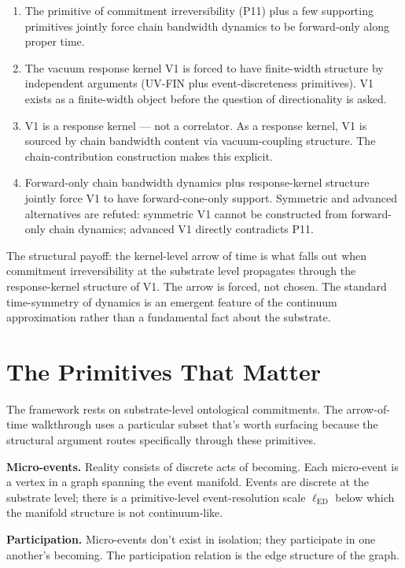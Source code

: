 \documentclass[11pt,a4paper]{article}
\begin{document}
\begin{enumerate}[noitemsep]
  \item The primitive of commitment irreversibility (P11) plus a few supporting primitives jointly force chain bandwidth dynamics to be forward-only along proper time.
  \item The vacuum response kernel V1 is forced to have finite-width structure by independent arguments (UV-FIN plus event-discreteness primitives). V1 exists as a finite-width object before the question of directionality is asked.
  \item V1 is a response kernel --- not a correlator. As a response kernel, V1 is sourced by chain bandwidth content via vacuum-coupling structure. The chain-contribution construction makes this explicit.
  \item Forward-only chain bandwidth dynamics plus response-kernel structure jointly force V1 to have forward-cone-only support. Symmetric and advanced alternatives are refuted: symmetric V1 cannot be constructed from forward-only chain dynamics; advanced V1 directly contradicts P11.
\end{enumerate}

The structural payoff: the kernel-level arrow of time is what falls out when commitment irreversibility at the substrate level propagates through the response-kernel structure of V1. The arrow is forced, not chosen. The standard time-symmetry of dynamics is an emergent feature of the continuum approximation rather than a fundamental fact about the substrate.

\section{The Primitives That Matter}

The framework rests on substrate-level ontological commitments. The arrow-of-time walkthrough uses a particular subset that's worth surfacing because the structural argument routes specifically through these primitives.

\textbf{Micro-events.} Reality consists of discrete acts of becoming. Each micro-event is a vertex in a graph spanning the event manifold. Events are discrete at the substrate level; there is a primitive-level event-resolution scale $\ell_{\mathrm{ED}}$ below which the manifold structure is not continuum-like.

\textbf{Participation.} Micro-events don't exist in isolation; they participate in one another's becoming. The participation relation is the edge structure of the graph.
\end{document}

